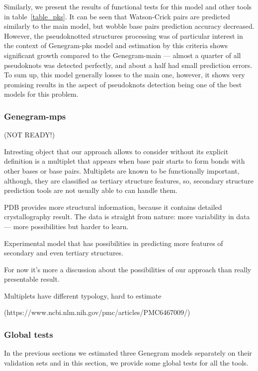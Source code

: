 Similarly, we present the results of functional tests for this model and other tools in table~\ref{table_pks}. It can be seen that Watson-Crick pairs are predicted similarly to the main model, but wobble base pairs prediction accuracy decreased. However, the pseudoknotted structures processing was of particular interest in the context of Genegram-pks model and estimation by this criteria shows significant growth compared to the Genegram-main --- almost a quarter of all pseudoknots was detected perfectly, and about a half had small prediction errors. To sum up, this model generally losses to the main one, however, it shows very promising results in the aspect of pseudoknots detection being one of the best models for this problem.



\subsubsection{Genegram-mps}
(NOT READY!)

Intresting object that our approach allows to consider without its explicit definition is a multiplet that appears when base pair starts to form bonds with other bases or base pairs. Multiplets are known to be functionally important, although, they are classified as tertiary structure features, so, secondary structure prediction tools are not usually able to can handle them. 

PDB provides more structural information, because it contains detailed crystallography result. The data is straight from nature: more variability in data --- more possibilities but harder to learn.

Experimental model that has possibilities in predicting more features of secondary and even tertiary structures.

For now it's more a discussion about the possibilities of our approach than really presentable result.

Multiplets have different typology, hard to estimate

(https://www.ncbi.nlm.nih.gov/pmc/articles/PMC6467009/) 

\subsubsection{Global tests}
In the previous sections we estimated three Genegram models separately on their validation sets and in this section, we provide some global tests for all the tools.

